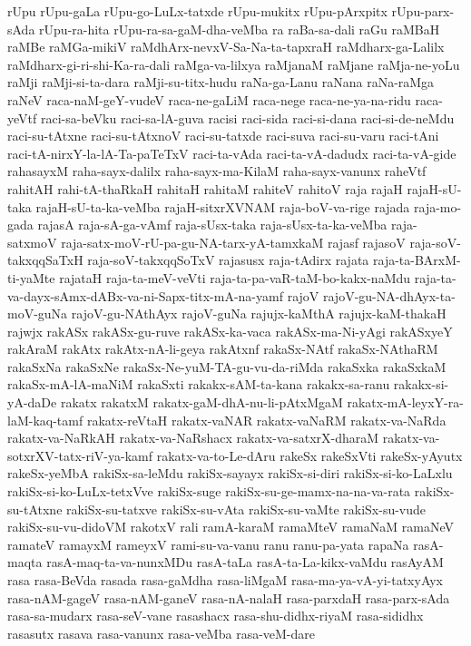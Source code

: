 {rUpu
rUpu-gaLa
rUpu-go-LuLx-tatxde
rUpu-mukitx
rUpu-pArxpitx
rUpu-parx-sAda
rUpu-ra-hita
rUpu-ra-sa-gaM-dha-veMba
ra
raBa-sa-dali
raGu
raMBaH
raMBe
raMGa-mikiV
raMdhArx-nevxV-Sa-Na-ta-tapxraH
raMdharx-ga-Lalilx
raMdharx-gi-ri-shi-Ka-ra-dali
raMga-va-lilxya
raMjanaM
raMjane
raMja-ne-yoLu
raMji
raMji-si-ta-dara
raMji-su-titx-hudu
raNa-ga-Lanu
raNana
raNa-raMga
raNeV
raca-naM-geY-vudeV
raca-ne-gaLiM
raca-nege
raca-ne-ya-na-ridu
raca-yeVtf
raci-sa-beVku
raci-sa-lA-guva
racisi
raci-sida
raci-si-dana
raci-si-de-neMdu
raci-su-tAtxne
raci-su-tAtxnoV
raci-su-tatxde
raci-suva
raci-su-varu
raci-tAni
raci-tA-nirxY-la-lA-Ta-paTeTxV
raci-ta-vAda
raci-ta-vA-dadudx
raci-ta-vA-gide
rahasayxM
raha-sayx-dalilx
raha-sayx-ma-KilaM
raha-sayx-vanunx
raheVtf
rahitAH
rahi-tA-thaRkaH
rahitaH
rahitaM
rahiteV
rahitoV
raja
rajaH
rajaH-sU-taka
rajaH-sU-ta-ka-veMba
rajaH-sitxrXVNAM
raja-boV-va-rige
rajada
raja-mo-gada
rajasA
raja-sA-ga-vAmf
raja-sUsx-taka
raja-sUsx-ta-ka-veMba
raja-satxmoV
raja-satx-moV-rU-pa-gu-NA-tarx-yA-tamxkaM
rajasf
rajasoV
raja-soV-takxqqSaTxH
raja-soV-takxqqSoTxV
rajasusx
raja-tAdirx
rajata
raja-ta-BArxM-ti-yaMte
rajataH
raja-ta-meV-veVti
raja-ta-pa-vaR-taM-bo-kakx-naMdu
raja-ta-va-dayx-sAmx-dABx-va-ni-Sapx-titx-mA-na-yamf
rajoV
rajoV-gu-NA-dhAyx-ta-moV-guNa
rajoV-gu-NAthAyx
rajoV-guNa
rajujx-kaMthA
rajujx-kaM-thakaH
rajwjx
rakASx
rakASx-gu-ruve
rakASx-ka-vaca
rakASx-ma-Ni-yAgi
rakASxyeY
rakAraM
rakAtx
rakAtx-nA-li-geya
rakAtxnf
rakaSx-NAtf
rakaSx-NAthaRM
rakaSxNa
rakaSxNe
rakaSx-Ne-yuM-TA-gu-vu-da-riMda
rakaSxka
rakaSxkaM
rakaSx-mA-lA-maNiM
rakaSxti
rakakx-sAM-ta-kana
rakakx-sa-ranu
rakakx-si-yA-daDe
rakatx
rakatxM
rakatx-gaM-dhA-nu-li-pAtxMgaM
rakatx-mA-leyxY-ra-laM-kaq-tamf
rakatx-reVtaH
rakatx-vaNAR
rakatx-vaNaRM
rakatx-va-NaRda
rakatx-va-NaRkAH
rakatx-va-NaRshacx
rakatx-va-satxrX-dharaM
rakatx-va-sotxrXV-tatx-riV-ya-kamf
rakatx-va-to-Le-dAru
rakeSx
rakeSxVti
rakeSx-yAyutx
rakeSx-yeMbA
rakiSx-sa-leMdu
rakiSx-sayayx
rakiSx-si-diri
rakiSx-si-ko-LaLxlu
rakiSx-si-ko-LuLx-tetxVve
rakiSx-suge
rakiSx-su-ge-mamx-na-na-va-rata
rakiSx-su-tAtxne
rakiSx-su-tatxve
rakiSx-su-vAta
rakiSx-su-vaMte
rakiSx-su-vude
rakiSx-su-vu-didoVM
rakotxV
rali
ramA-karaM
ramaMteV
ramaNaM
ramaNeV
ramateV
ramayxM
rameyxV
rami-su-va-vanu
ranu
ranu-pa-yata
rapaNa
rasA-maqta
rasA-maq-ta-va-nunxMDu
rasA-taLa
rasA-ta-La-kikx-vaMdu
rasAyAM
rasa
rasa-BeVda
rasada
rasa-gaMdha
rasa-liMgaM
rasa-ma-ya-vA-yi-tatxyAyx
rasa-nAM-gageV
rasa-nAM-ganeV
rasa-nA-nalaH
rasa-parxdaH
rasa-parx-sAda
rasa-sa-mudarx
rasa-seV-vane
rasashacx
rasa-shu-didhx-riyaM
rasa-sididhx
rasasutx
rasava
rasa-vanunx
rasa-veMba
rasa-veM-dare
}

